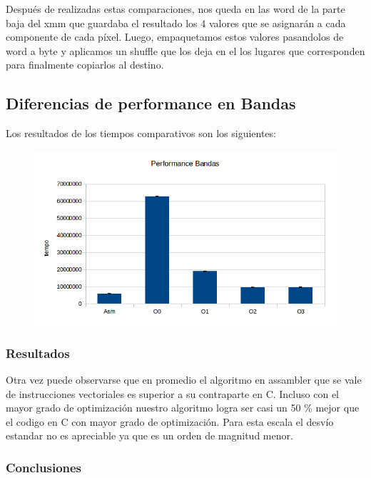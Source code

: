 \documentclass[a4paper]{article}
\begin{document}
 Después de realizadas estas comparaciones, nos queda en las word de la parte baja del xmm que guardaba el resultado los 4 valores que se asignarán a cada componente de cada píxel. Luego, empaquetamos estos valores pasandolos de word a byte y aplicamos un shuffle que los deja en el los lugares que corresponden para finalmente copiarlos al destino. 

\subsection{Diferencias de performance en Bandas}

Los resultados de los tiempos comparativos son los siguientes:

\newpage

\begin{figure}[h!]
  \begin{center}
  \includegraphics[scale=0.66]{Graficos1.4/ban/per.jpg}
  \label{nombreparareferenciar9}
  \end{center}
\end{figure}

\subsubsection{Resultados}
Otra vez puede observarse que en promedio el algoritmo en assambler que se vale de instrucciones vectoriales es superior a su contraparte en C. Incluso con el mayor grado de optimización nuestro algoritmo logra ser casi un 50 \% mejor que el codigo en C con mayor grado de optimización. Para esta escala el desvío estandar no es apreciable ya que es un orden de magnitud menor.

\subsubsection{Conclusiones}
\end{document}
